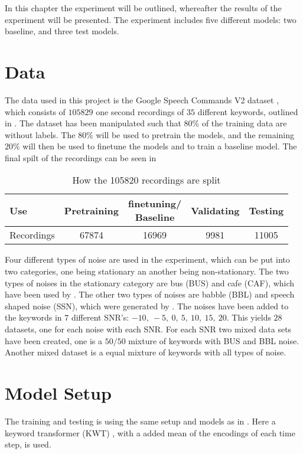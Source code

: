 In this chapter the experiment will be outlined, whereafter the results of the experiment will be presented. The experiment includes five different models: two baseline, and three test models.

\section{Data}
The data used in this project is the Google Speech Commands V2 dataset \cite{warden2018speech}, which consists of \(105829\) one second recordings of \(35\) different keywords, outlined in . The dataset has been manipulated such that \(80\%\) of the training data are without labels. The \(80\%\) will be used to pretrain the models, and the remaining \(20\%\) will then be used to finetune the models and to train a baseline model. The final spilt of the recordings can be seen in 

\begin{table}[ht]
    \centering
    \begin{tabular}{@{}lcccc@{}}
        \toprule
        Use    & Pretraining & \makecell{ finetuning/ \\ Baseline } & Validating & Testing \\ \midrule
        Recordings   & 67874  & 16969 & 9981 & 11005 \\ 
        \bottomrule
    \end{tabular}
    \caption{How the 105820 recordings are split}
    \label{tab:data_split}
\end{table}

Four different types of noise are used in the experiment, which can be put into two categories, one being stationary an another being non-stationary. The two types of noises in the stationary category are bus (BUS) and cafe (CAF), which have been used by \cite{barker2015third}. The other two types of noises are babble (BBL) and speech shaped noise (SSN), which were generated by \cite{kolboek2016speech}. The noises have been added to the keywords in \(7\) different SNR's: \(-10, \ -5, \ 0, \ 5, \ 10, \ 15, \ 20\). This yields \(28\) datasets, one for each noise with each SNR.
For each SNR two mixed data sets have been created, one is a \(50/50\) mixture of keywords with BUS and BBL noise. Another mixed dataset is a equal mixture of keywords with all types of noise.

\section{Model Setup}
The training and testing is using the same setup and models as in \cite{bovbjerg2023improving}. Here a keyword transformer (KWT) \cite{berg2021keyword}, with a added mean of the encodings of each time step, is used. 

